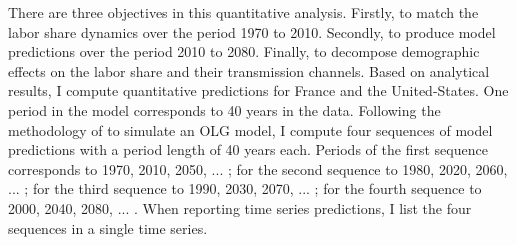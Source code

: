 There are three objectives in this quantitative analysis. Firstly, to match the labor share dynamics over the period 1970 to 2010. Secondly, to produce model predictions over the period 2010 to 2080. Finally, to decompose demographic effects on the labor share and their transmission channels. Based on analytical results, I compute quantitative predictions for France and the United-States. One period in the model corresponds to 40 years in the data. Following the methodology of \cite{Gonzalez-Eiras2012} to simulate an OLG model, I compute four sequences of model predictions with a period length of 40 years each. Periods of the first sequence corresponds to 1970, 2010, 2050, ... ; for the second sequence to 1980, 2020, 2060, ... ; for the third sequence to 1990, 2030, 2070, ... ; for the fourth sequence to 2000, 2040, 2080, ... . When reporting time series predictions, I list the four sequences in a single time series.

